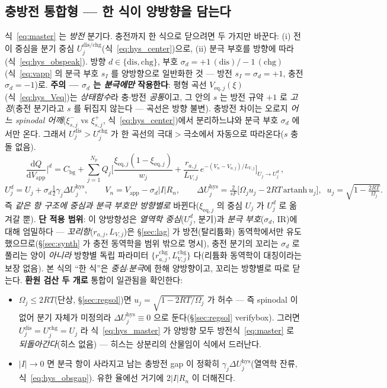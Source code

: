 \documentclass[11pt,a4paper]{article}
\newcommand{\dd}{\mathrm{d}}
\newcommand{\eq}{\mathrm{eq}}
\newcommand{\app}{\mathrm{app}}
\newcommand{\bg}{\mathrm{bg}}
\newcommand{\dis}{\mathrm{dis}}
\newcommand{\chg}{\mathrm{chg}}
\newcommand{\hys}{\mathrm{hys}}
\begin{document}
\subsection{충방전 통합형 — 한 식이 양방향을 담는다}
식~\eqref{eq:master} 는 \emph{방전} 분기다. 충전까지 한 식으로 닫으려면 두 가지만 바꾼다: (i) 전이 중심을 분기 중심
$U_j^{\dis/\chg}$(식~\eqref{eq:hys_center})으로, (ii) 분극 부호를 방향에 따라(식~\eqref{eq:hys_obspeak}). 방향
$d\in\{\dis,\chg\}$, 부호 $\sigma_d=+1\,(\dis)/-1\,(\chg)$ (식~\eqref{eq:vapp} 의 분극 부호 $s_I$ 를 양방향으로
일반화한 것 — 방전 $s_I=\sigma_d=+1$, 충전 $\sigma_d=-1$)로. \textbf{주의 — $\sigma_d$ 는 \emph{분극에만} 작용한다}:
평형 곡선 $V_{\eq,j}(\xi)$(식~\eqref{eq:hys_Veq})는 \emph{상태함수}라 충$\cdot$방전 \emph{공통}이고, 그 안의 $s$ 는
방전 규약 $+1$ 로 \emph{고정}(충전 분기라고 $s$ 를 뒤집지 않는다 — 곡선은 방향 불변). 충방전 차이는 오로지 \emph{어느
spinodal 어깨}($\xi_{s,j}^-$ vs $\xi_{s,j}^+$, 식~\eqref{eq:hys_center})에서 분리하느냐와 분극 부호 $\sigma_d$ 에서만
온다. 그래서 $U_j^\dis>U_j^\chg$ 가 한 곡선의 극대$>$극소에서 자동으로 따라온다($s$ 충돌 없음).
\begin{equation}
\boxed{\;\frac{\dd Q}{\dd V_\app}\Big|^{d}=C_\bg+\sum_{j=1}^{N_p}Q_j\bigg[\frac{\xi_{\eq,j}(1-\xi_{\eq,j})}{w_j}
+\frac{r_{a,j}}{L_{V,j}}\,e^{-(V_n-V_{a,j})/L_{V,j}}\bigg]_{U_j\to U_j^{d}}\,,}
\label{eq:hys_master}
\end{equation}
\begin{equation*}
U_j^{d}=U_j+\sigma_d\tfrac12\gamma_j\Delta U_j^\hys,\qquad V_n=V_\app-\sigma_d|I|R_n,\qquad
\Delta U_j^\hys=\tfrac{2}{sF}\big[\Omega_j u_j-2RT\,\mathrm{artanh}\,u_j\big],\;\;u_j=\sqrt{1-\tfrac{2RT}{\Omega_j}}.
\end{equation*}
즉 \emph{같은 항 구조에 중심과 분극 부호만 방향별로} 바뀐다($\xi_{\eq,j}$ 의 중심 $U_j$ 가 $U_j^d$ 로 옮겨갈 뿐).
\textbf{단 적용 범위}: 이 양방향성은 \emph{열역학 중심}($U_j^d$, 분기)과 \emph{분극 부호}($\sigma_d$, IR)에 대해 엄밀하다 —
\emph{꼬리항}($r_{a,j},L_{V,j}$)은 \S\ref{sec:lag} 가 방전(탈리튬화) 동역학에서만 유도했으므로(\S\ref{sec:synth} 가 충전
동역학을 범위 밖으로 명시), 충전 분기의 꼬리는 $\sigma_d$ 로 풀리는 양이 \emph{아니라} 방향별 독립 파라미터
$\{r_{a,j}^\chg,L_{V,j}^\chg\}$ 다(리튬화 동역학이 대칭이라는 보장 없음). 본 식의 ``한 식''은 \emph{중심$\cdot$분극}에
한해 양방향이고, 꼬리는 방향별로 따로 닫는다.
\textbf{환원 검산 두 개로} 통합이 일관됨을 확인한다:
\begin{itemize}[leftmargin=1.4em,itemsep=2pt]
\item $\Omega_j\le2RT$(단상, \S\ref{sec:regsol})면 $u_j=\sqrt{1-2RT/\Omega_j}$ 가 허수 — 즉 spinodal 이 없어 분기
  자체가 미정의라 $\Delta U_j^\hys\equiv0$ 으로 둔다(\S\ref{sec:regsol} verifybox). 그러면 $U_j^\dis=U_j^\chg=U_j$ 라
  식~\eqref{eq:hys_master} 가 양방향 모두 방전식~\eqref{eq:master} 로 \emph{되돌아간다}(히스 없음) — 히스는 상분리의 산물임이 식에서 드러난다.
\item $|I|\to0$ 면 분극 항이 사라지고 남는 충방전 gap 이 정확히 $\gamma_j\Delta U_j^\hys$(열역학 잔류,
  식~\eqref{eq:hys_obsgap}). 유한 율에선 거기에 $2|I|R_n$ 이 더해진다.
\end{itemize}
\end{document}
